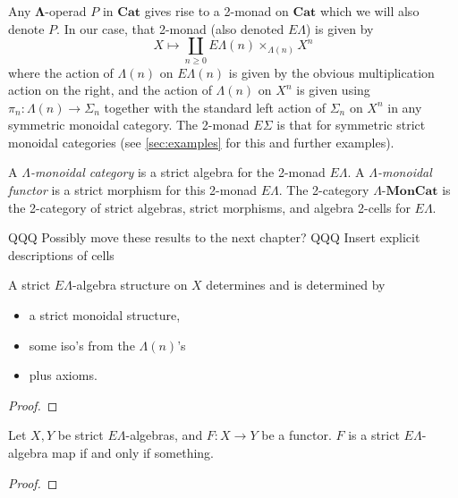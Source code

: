 \documentclass{amsbook} %
\newcommand{\mb}{\mathbf}
\newcommand{\EL}{E\Lambda}
\newcommand{\lmc}{\Lambda\mbox{-}\mb{MonCat}}
\numberwithin{section}{chapter}
\begin{document}
Any $\mb{\Lambda}$-operad $P$ in $\mb{Cat}$ gives rise to a 2-monad on $\mb{Cat}$ which we will also denote $P$.  In our case, that 2-monad (also denoted $E\Lambda$) is given by
\[
X \mapsto \coprod_{n \geq 0} E\Lambda(n) \times_{\Lambda(n)} X^{n}
\]
where the action of $\Lambda(n)$ on $E\Lambda(n)$ is given by the obvious multiplication action on the right, and the action of $\Lambda(n)$ on $X^{n}$ is given using $\pi_{n} \colon \Lambda(n) \rightarrow \Sigma_{n}$ together with the standard left action of $\Sigma_{n}$ on $X^{n}$ in any symmetric monoidal category.  The 2-monad $E\Sigma$ is that for symmetric strict monoidal categories (see \cref{sec:examples} for this and further examples).

\begin{Defi}\label{lmc}
A \emph{$\Lambda$-monoidal category} is a strict algebra for the 2-monad $\EL$. A \emph{$\Lambda$-monoidal functor} is a strict morphism for this 2-monad $\EL$. The 2-category $\lmc$ is the 2-category of strict algebras, strict morphisms, and algebra 2-cells for $\EL$.
\end{Defi}

QQQ Possibly move these results to the next chapter?
QQQ Insert explicit descriptions of cells
\begin{prop}\label{el_via_moncats}
A strict $\EL$-algebra structure on $X$ determines and is determined by
\begin{itemize}
\item a strict monoidal structure,
\item some iso's from the $\Lambda(n)$'s
\item plus axioms.
\end{itemize}
\end{prop}
\begin{proof}

\end{proof}

\begin{prop}\label{el_strictmap}
Let $X,Y$ be strict $\EL$-algebras, and $F \colon X \to Y$ be a functor. $F$ is a strict $\EL$-algebra map if and only if something.
\end{prop}
\begin{proof}

\end{proof}
\end{document}
